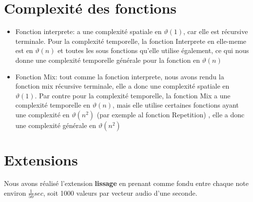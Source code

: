 \documentclass[a4paper,12pt]{report}
\begin{document}
\section*{Complexité des fonctions}
\begin{itemize}


\item Fonction interprete: a une complexité spatiale en $\vartheta(1)$, car elle est récursive terminale.
Pour la complexité temporelle, la fonction Interprete en elle-meme est en  $\vartheta(n)$ et toutes les sous fonctions qu'elle utilise également, ce qui nous donne une complexité temporelle  générale pour la fonction en  $\vartheta(n)$
\item Fonction Mix: tout comme la fonction interprete, nous avons rendu la fonction mix récursive terminale, elle a donc une complexité spatiale en  $\vartheta(1)$. Par contre pour la complexité temporelle, la fonction Mix a une complexité temporelle en  $\vartheta(n)$, mais elle utilise certaines fonctions ayant une complexité en  $\vartheta(n^2)$ (par exemple al fonction Repetition) , elle a donc une complexité générale en  $\vartheta(n^2)$

\end{itemize} 


\section*{Extensions}
Nous avons réalisé l'extension {\large \textbf{lissage}} en prenant comme fondu entre chaque note environ $\frac{1}{50} sec$, soit 1000 valeurs par vecteur audio d'une seconde. 
\end{document}
